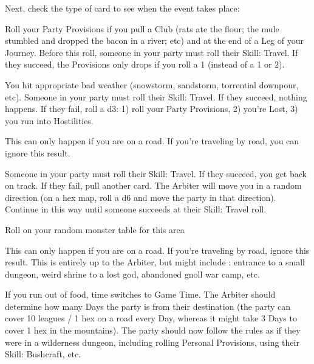 {\begin{multicols}{2}
  Next, check the type of card to see when the event takes place:




  Roll your Party Provisions if you pull a Club (rats ate the flour; the mule stumbled and dropped the bacon in a river; etc) and at the end of a Leg of your Journey.  Before this roll, someone in your party must roll their Skill: Travel.  If they succeed, the Provisions \UD only drops \DCDOWN if you roll a 1 (instead of a 1 or 2).  

  You hit appropriate bad weather (snowstorm, sandstorm, torrential downpour, etc).  Someone in your party must roll their Skill: Travel.  If they succeed, nothing happens.  If they fail, roll a d3:  1) roll your Party Provisions, 2) you're Lost, 3) you run into Hostilities.

  This can only happen if you are  on a road. If you're traveling by road, you can ignore this result.

  Someone in your party must roll their Skill: Travel.  If they succeed, you get back on track.  If they fail, pull another card. The Arbiter will move you in a random direction (on a hex map, roll a d6 and move the party in that direction). Continue in this way until someone succeeds at their Skill: Travel roll.  

  Roll on your random monster table for this area

  This can only happen if you are  on a road. If you're traveling by road, ignore this result.  This is entirely up to the Arbiter, but might include : entrance to a small dungeon, weird shrine to a lost god, abandoned gnoll war camp, etc.


  If you run out of food, time switches to Game Time.  The Arbiter should determine how many Days the party is from their destination (the party can cover 10 leagues / 1 hex on a road every Day, whereas it might take 3 Days to cover 1 hex in the mountains).  The party should now follow the rules as if they were in a wilderness dungeon, including rolling Personal Provisions, using their Skill: Bushcraft, etc. 



\end{multicols}}
